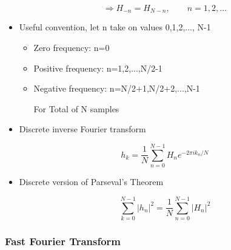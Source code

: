 \begin{itemize}
    \[ \Rightarrow H_{-n} = H_{N-n}, \qquad n=1,2,\ldots\]

    \item Useful convention, let n take on values 0,1,2,..., N-1

    \begin{itemize}
        \item Zero frequency: n=0
        \item Positive frequency: n=1,2,...,N/2-1
        \item Negative frequency: n=N/2+1,N/2+2,...,N-1

        For Total of N samples 
        
    \end{itemize}

    \item Discrete inverse Fourier transform

    \[ h_k = \frac{1}{N} \sum_{n=0}^{N-1} H_n e^{-2 \pi i k_n/N}\]

    \item Discrete version of Parseval's Theorem

    \[ \sum_{k=0}^{N-1} |h_n|^2 =  \frac{1}{N} \sum_{n=0}^{N-1} |H_n|^2\]
\end{itemize}

\subsubsection{Fast Fourier Transform}

